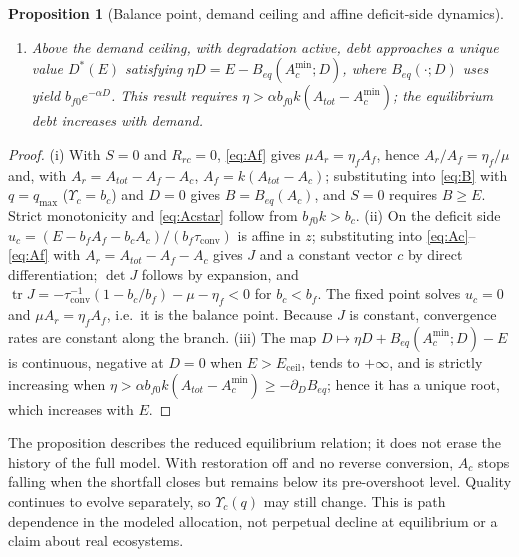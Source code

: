 \documentclass[preprint,12pt,authoryear]{elsarticle}
\newtheorem{proposition}{Proposition}
\newcommand{\Ups}{\Upsilon_c}
\newcommand{\Eceil}{E_{\mathrm{ceil}}}
\newcommand{\Acmin}{A_c^{\min}}
\newcommand{\tconv}{\tau_{\mathrm{conv}}}
\begin{document}
\begin{proposition}[Balance point, demand ceiling and affine deficit-side dynamics]
\begin{enumerate}[label=(\roman*)]
and $\operatorname{tr}J<0$. The matrix does not depend on demand or on the current state. Its determinant is positive exactly when $B_{eq}$ decreases, and its fixed point is the balance point in (i). For $B_{eq}(A_{tot})\le E<\Eceil$, trajectories that remain in this regime approach that point at rates set by the eigenvalues of $J$. For $E>\Eceil$, the balance point would lie below the allowed minimum: $A_c$ approaches $\Acmin$ asymptotically and the shortfall tends to $S^*=E-\Eceil>0$. Thus the reduced balance curve meets the minimum-area boundary; it does not turn back or form a fold. The leading eigenvalue does not approach zero at $E=\Eceil$, and the reduced equilibrium relation has no hysteresis. These conclusions hold under the stated assumptions and do not imply that the realized land allocation is independent of its history.
\item Above the demand ceiling, with degradation active, debt approaches a unique value $D^*(E)$ satisfying $\eta D=E-B_{eq}(\Acmin;D)$, where $B_{eq}(\cdot;D)$ uses yield $b_{f0}e^{-\alpha D}$. This result requires $\eta>\alpha b_{f0}k(A_{tot}-\Acmin)$; the equilibrium debt increases with demand.
\end{enumerate}
\end{proposition}

\begin{proof}
(i) With $S=0$ and $R_{rc}=0$, \eqref{eq:Af} gives $\mu A_r=\eta_fA_f$, hence $A_r/A_f=\eta_f/\mu$ and, with $A_r=A_{tot}-A_f-A_c$, $A_f=k(A_{tot}-A_c)$; substituting into \eqref{eq:B} with $q=q_{\max}$ ($\Ups=b_c$) and $D=0$ gives $B=B_{eq}(A_c)$, and $S=0$ requires $B\ge E$. Strict monotonicity and \eqref{eq:Acstar} follow from $b_{f0}k>b_c$. (ii) On the deficit side $u_c=(E-b_fA_f-b_cA_c)/(b_f\tconv)$ is affine in $z$; substituting into \eqref{eq:Ac}--\eqref{eq:Af} with $A_r=A_{tot}-A_f-A_c$ gives $J$ and a constant vector $c$ by direct differentiation; $\det J$ follows by expansion, and $\operatorname{tr}J=-\tconv^{-1}(1-b_c/b_f)-\mu-\eta_f<0$ for $b_c<b_f$. The fixed point solves $u_c=0$ and $\mu A_r=\eta_fA_f$, i.e.\ it is the balance point. Because $J$ is constant, convergence rates are constant along the branch. (iii) The map $D\mapsto\eta D+B_{eq}(\Acmin;D)-E$ is continuous, negative at $D=0$ when $E>\Eceil$, tends to $+\infty$, and is strictly increasing when $\eta>\alpha b_{f0}k(A_{tot}-\Acmin)\ge-\partial_DB_{eq}$; hence it has a unique root, which increases with $E$.
\end{proof}
The proposition describes the reduced equilibrium relation; it does not erase the history of the full model. With restoration off and no reverse conversion, $A_c$ stops falling when the shortfall closes but remains below its pre-overshoot level. Quality continues to evolve separately, so $\Ups(q)$ may still change. This is path dependence in the modeled allocation, not perpetual decline at equilibrium or a claim about real ecosystems.
\end{document}
